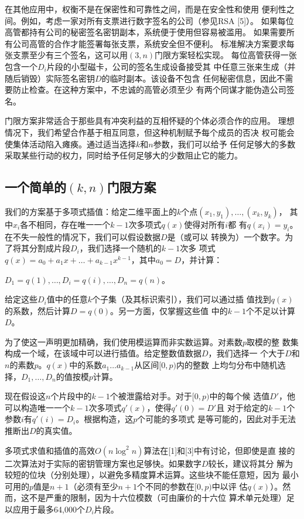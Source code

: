 在其他应用中，权衡不是在保密性和可靠性之间，而是在安全性和使用
便利性之间。例如，考虑一家对所有支票进行数字签名的公司（参见RSA [5]）。
如果每位高管都持有公司的秘密签名密钥副本，系统便于使用但容易被滥用。
如果需要所有公司高管的合作才能签署每张支票，系统安全但不便利。
标准解决方案要求每张支票至少有三个签名，这可以用$(3, n)$门限方案轻松实现。
每位高管获得一张包含一个$D_i$片段的小型磁卡，公司的签名生成设备接受其
中任意三张来生成（并随后销毁）实际签名密钥$D$的临时副本。该设备不包含
任何秘密信息，因此不需要防止检查。在这种方案中，不忠诚的高管必须至少
有两个同谋才能伪造公司签名。

门限方案非常适合于那些具有冲突利益的互相怀疑的个体必须合作的应用。
理想情况下，我们希望合作基于相互同意，但这种机制赋予每个成员的否决
权可能会使集体活动陷入瘫痪。通过适当选择$k$和$n$参数，我们可以给予
任何足够大的多数采取某些行动的权力，同时给予任何足够大的少数阻止它的能力。

\subsection{一个简单的\texorpdfstring{$(k, n)$}{(k, n)}门限方案}
我们的方案基于多项式插值：给定二维平面上的$k$个点$(x_1, y_1), \ldots, (x_k, y_k)$，
其中$x_i$各不相同，存在唯一一个$k-1$次多项式$q(x)$使得对所有$i$都
有$q(x_i) = y_i$。在不失一般性的情况下，我们可以假设数据$D$是（或可以
转换为）一个数字。为了将其分割成片段$D_i$，我们选择一个随机的$k-1$次多
项式$q(x) = a_0 + a_1x + \ldots + a_{k-1}x^{k-1}$，其中$a_0 = D$，并计算：

$D_1 = q(1), \ldots, D_i = q(i), \ldots, D_n = q(n)$。

给定这些$D_i$值中的任意$k$个子集（及其标识索引），我们可以通过插
值找到$q(x)$的系数，然后计算$D = q(0)$。另一方面，仅掌握这些值
中的$k-1$个不足以计算$D$。

为了使这一声明更加精确，我们使用模运算而非实数运算。对素数$p$取模的整
数集构成一个域，在该域中可以进行插值。给定整数值数据$D$，我们选择一
个大于$D$和$n$的素数$p$。$q(x)$中的系数$a_1 \ldots a_{k-1}$从区间$[0, p)$内的整数
上均匀分布中随机选择，$D_1, \ldots, D_n$的值按模$p$计算。

现在假设这$n$个片段中的$k-1$个被泄露给对手。对于$[0, p)$中的每个候
选值$D'$，他可以构造唯一一个$k-1$次多项式$q'(x)$，使得$q'(0) = D'$且
对于给定的$k-1$个参数$i$有$q'(i) = D_i$。根据构造，这$p$个可能的多项式
是等可能的，因此对手无法推断出$D$的真实值。

多项式求值和插值的高效$O(n \log^2 n)$算法在[1]和[3]中有讨论，但即使是直
接的二次算法对于实际的密钥管理方案也足够快。如果数字$D$较长，建议将其分
解为较短的位块（分别处理），以避免多精度算术运算。这些块不能任意短，因为
最小可用的$p$值是$n+1$（必须有至少$n+1$个不同的参数在$[0, p)$中以评
估$q(x)$）。然而，这不是严重的限制，因为十六位模数（可由廉价的十六位
算术单元处理）足以应用于最多64,000个$D_i$片段。

